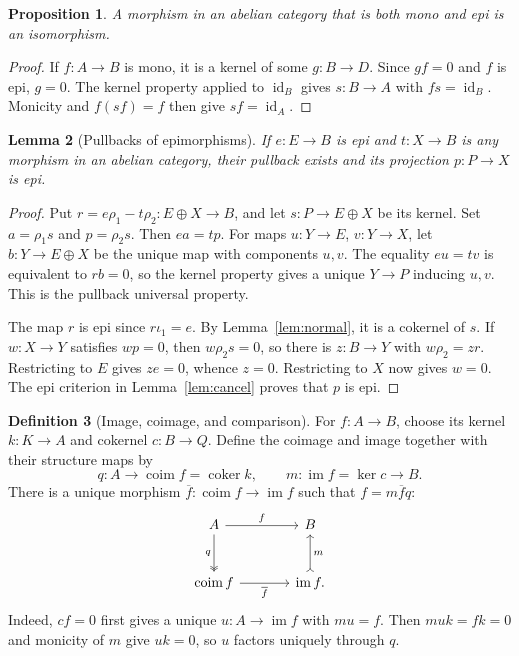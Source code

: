 \documentclass[11pt]{article}
\theoremstyle{definition}
\newtheorem{definition}{Definition}[section]
\theoremstyle{plain}
\newtheorem{proposition}[definition]{Proposition}
\newtheorem{lemma}[definition]{Lemma}
\newcommand{\id}{\operatorname{id}}
\newcommand{\im}{\operatorname{im}}
\newcommand{\coim}{\operatorname{coim}}
\newcommand{\coker}{\operatorname{coker}}
\newcommand{\fbar}{\overline{f}}
\begin{document}
\begin{proposition}\label{prop:balanced}
A morphism in an abelian category that is both mono and epi is an isomorphism.
\end{proposition}
\begin{proof}
If $f\colon A\to B$ is mono, it is a kernel of some $g\colon B\to D$. Since $gf=0$ and $f$ is epi, $g=0$. The kernel property applied to $\id_B$ gives $s\colon B\to A$ with $fs=\id_B$. Monicity and $f(sf)=f$ then give $sf=\id_A$.
\end{proof}

\begin{lemma}[Pullbacks of epimorphisms]\label{lem:pullback}
If $e\colon E\to B$ is epi and $t\colon X\to B$ is any morphism in an abelian category, their pullback exists and its projection $p\colon P\to X$ is epi.
\end{lemma}
\begin{proof}
Put $r=e\rho_1-t\rho_2\colon E\oplus X\to B$, and let $s\colon P\to E\oplus X$ be its kernel. Set $a=\rho_1s$ and $p=\rho_2s$. Then $ea=tp$. For maps $u\colon Y\to E$, $v\colon Y\to X$, let $b\colon Y\to E\oplus X$ be the unique map with components $u,v$. The equality $eu=tv$ is equivalent to $rb=0$, so the kernel property gives a unique $Y\to P$ inducing $u,v$. This is the pullback universal property.

The map $r$ is epi since $r\iota_1=e$. By Lemma~\ref{lem:normal}, it is a cokernel of $s$. If $w\colon X\to Y$ satisfies $wp=0$, then $w\rho_2s=0$, so there is $z\colon B\to Y$ with $w\rho_2=zr$. Restricting to $E$ gives $ze=0$, whence $z=0$. Restricting to $X$ now gives $w=0$. The epi criterion in Lemma~\ref{lem:cancel} proves that $p$ is epi.
\end{proof}

\begin{definition}[Image, coimage, and comparison]
For $f\colon A\to B$, choose its kernel $k\colon K\to A$ and cokernel $c\colon B\to Q$. Define the coimage and image together with their structure maps by
\[
q\colon A\longrightarrow\coim f=\coker k,
\qquad
m\colon\im f=\ker c\longrightarrow B.
\]
There is a unique morphism $\fbar\colon\coim f\to\im f$ such that $f=m\fbar q$:
\[
\begin{tikzcd}[column sep=large,row sep=large]
A\arrow[r,"f"]\arrow[d,two heads,"q"']&B\\
\coim f\arrow[r,"\fbar"']&\im f\arrow[u,tail,"m"'].
\end{tikzcd}
\]
Indeed, $cf=0$ first gives a unique $u\colon A\to\im f$ with $mu=f$. Then $muk=fk=0$ and monicity of $m$ give $uk=0$, so $u$ factors uniquely through $q$.
\end{definition}
\end{document}
